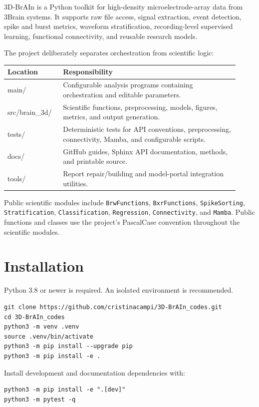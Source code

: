 \documentclass[11pt,a4paper]{article}
\newcommand{\code}[1]{\texttt{#1}}
\begin{document}
3D-BrAIn is a Python toolkit for high-density microelectrode-array data from
3Brain systems. It supports raw file access, signal extraction, event detection,
spike and burst metrics, waveform stratification, recording-level supervised
learning, functional connectivity, and reusable research models.

The project deliberately separates orchestration from scientific logic:

\begin{longtable}{>{\ttfamily}p{0.22\linewidth}p{0.70\linewidth}}
\toprule
Location & Responsibility \\
\midrule
main/ & Configurable analysis programs containing orchestration and editable parameters. \\
src/brain\_3d/ & Scientific functions, preprocessing, models, figures, metrics, and output generation. \\
tests/ & Deterministic tests for API conventions, preprocessing, connectivity, Mamba, and configurable scripts. \\
docs/ & GitHub guides, Sphinx API documentation, methods, and printable source. \\
tools/ & Report repair/building and model-portal integration utilities. \\
\bottomrule
\end{longtable}

Public scientific modules include \code{BrwFunctions}, \code{BxrFunctions},
\code{SpikeSorting}, \code{Stratification},
\code{Classification}, \code{Regression}, \code{Connectivity}, and
\code{Mamba}. Public functions and classes use the project's PascalCase
convention throughout the scientific modules.

\section{Installation}

Python 3.8 or newer is required. An isolated environment is recommended.

\begin{lstlisting}
git clone https://github.com/cristinacampi/3D-BrAIn_codes.git
cd 3D-BrAIn_codes
python3 -m venv .venv
source .venv/bin/activate
python3 -m pip install --upgrade pip
python3 -m pip install -e .
\end{lstlisting}

Install development and documentation dependencies with:

\begin{lstlisting}
python3 -m pip install -e ".[dev]"
python3 -m pytest -q
\end{lstlisting}
\end{document}
